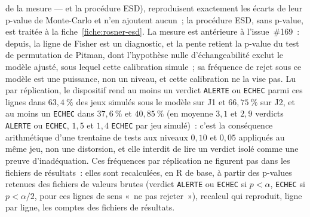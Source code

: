 \documentclass[a4paper,11pt]{article}
\newcommand{\code}[1]{\texttt{\small #1}}
\begin{document}
de la mesure --- et la procédure ESD), reproduisent exactement les écarts de leur p-value de Monte-Carlo et n'en
ajoutent aucun~; la procédure ESD, sans p-value, est traitée à la fiche~\ref{fiche:rosner-esd}.
La mesure est antérieure à l'issue~\#169~: depuis, la ligne de Fisher est un diagnostic, et la
pente retient la p-value du test de permutation de Pitman, dont l'hypothèse nulle
d'échangeabilité exclut le modèle ajusté, sous lequel cette calibration simule~; sa fréquence de
rejet sous ce modèle est une puissance, non un niveau, et cette calibration ne la vise pas.
Lu par réplication, le dispositif rend au moins un verdict \code{ALERTE} ou \code{ECHEC} parmi
ces lignes dans $63{,}4~\%$ des jeux simulés sous le modèle sur J1 et $66{,}75~\%$ sur J2, et
au moins un \code{ECHEC} dans $37{,}6~\%$ et $40{,}85~\%$ (en moyenne $3{,}1$ et $2{,}9$
verdicts \code{ALERTE} ou \code{ECHEC}, $1{,}5$ et $1{,}4$ \code{ECHEC} par jeu simulé)~: c'est
la conséquence arithmétique d'une trentaine de tests aux niveaux $0{,}10$ et $0{,}05$ appliqués
au même jeu, non une distorsion, et elle interdit de lire un verdict isolé comme une preuve
d'inadéquation. Ces fréquences par réplication ne figurent pas dans les fichiers de résultats~:
elles sont recalculées, en R de base, à partir des p-values retenues des fichiers de valeurs
brutes (verdict \code{ALERTE} ou \code{ECHEC} si $p < \alpha$, \code{ECHEC} si
$p < \alpha/2$, pour ces lignes de sens «~ne pas rejeter~»), recalcul qui reproduit, ligne par
ligne, les comptes des fichiers de résultats.
\end{document}
